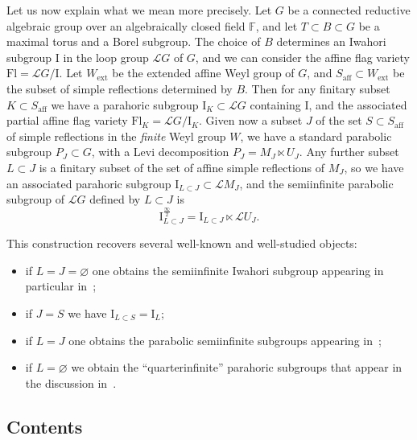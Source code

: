 \documentclass[11pt]{amsart}
\numberwithin{equation}{section}
\theoremstyle{plain}
\theoremstyle{definition}
\newcommand{\I}{{\mathrm I}}
\newcommand{\sL}{{\mathcal L}}
\newcommand{\semi}{{{\frac{\infty}{2}}}}
\newcommand{\ex}{\mathrm{ext}}
\newcommand{\af}{\mathrm{aff}}
\newcommand{\Fl}{\mathrm{Fl}}
\begin{document}
Let us now explain what we mean more precisely. Let $G$ be a connected reductive algebraic group over an algebraically closed field $\mathbb{F}$, and let $T \subset B \subset G$ be a maximal torus and a Borel subgroup. The choice of $B$ determines an Iwahori subgroup $\I$ in the loop group $\sL G$ of $G$, and we can consider the affine flag variety $\Fl=\sL G / \I$.
Let $W_\ex$ be the extended affine Weyl group of $G$, and $S_\af \subset W_\ex$ be the subset of simple reflections determined by $B$. Then for any finitary subset $K \subset S_\af$ we have a parahoric subgroup $\I_K \subset \sL G$ containing $\I$, and the associated partial affine flag variety $\Fl_K=\sL G/\I_K$. Given now a subset $J$ of the set $S \subset S_\af$ of simple reflections in the \emph{finite} Weyl group $W$, we have a standard parabolic subgroup $P_J \subset G$, with a Levi decomposition $P_J = M_J \ltimes U_J$. Any further subset $L \subset J$ is a finitary subset of the set of affine simple reflections of $M_J$, so we have an associated parahoric subgroup $\I_{L \subset J} \subset \sL M_J$, and the semiinfinite parabolic subgroup of $\sL G$ defined by $L \subset J$ is
\[
\I^\semi_{L \subset J} = \I_{L \subset J} \ltimes \sL U_J.
\]

This construction recovers several well-known and well-studied objects:
\begin{itemize}
\item
if $L=J=\varnothing$ one obtains the semiinfinite Iwahori subgroup appearing in particular in~\cite{Gaits18,adr};
\item
if $J=S$ we have $\I_{L \subset S} = \I_L$;
\item
if $L=J$ one obtains the parabolic semiinfinite subgroups appearing in~\cite{DL23};
\item
if $L=\varnothing$ we obtain the ``quarterinfinite'' parahoric subgroups that appear in the discussion in~\cite[\S 8.11]{bez-losev}.
\end{itemize}

\subsection{Contents}
\end{document}
